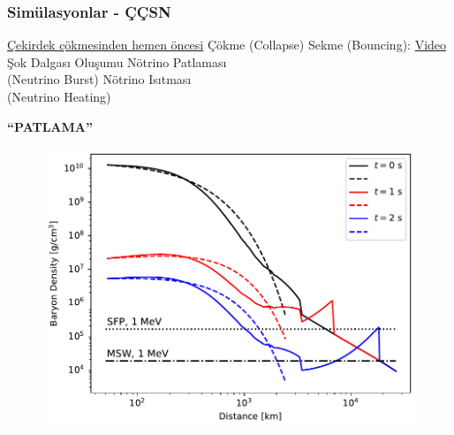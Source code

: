 \documentclass[10pt]{beamer}
\begin{document}
\begin{frame}
    \frametitle{Simülasyonlar - ÇÇSN}
    \begin{minipage}{0.5\textwidth}
        \footnotesize
        \begin{outline}
            \1[\textbullet] \href{https://irfu.cea.fr/dap/Phocea/Vie_des_labos/Ast/ast_sstechnique.php?id_ast=4058}{\color{blue}Çekirdek çökmesinden hemen öncesi}
            \1[\textbullet] Çökme (Collapse)
            \1[\textbullet] Sekme (Bouncing): \href{https://www.youtube.com/clip/Ugkx3nDxd0FXSw_dHn3UGCC0UW8JQ9UhjZn3}{\color{blue}Video}
            \1[\textbullet] Şok Dalgası Oluşumu
            \1[\textbullet] Nötrino Patlaması \\(Neutrino Burst)
            \1[\textbullet] Nötrino Isıtması  \\(Neutrino Heating)
        \end{outline}
        \begin{center}
            \textbf{“PATLAMA”}
        \end{center}
        \begin{outline}
        \end{outline}
        \normalsize
    \end{minipage}
    \hfill
    \begin{minipage}{0.45\textwidth}
        \begin{figure}[hbt!]
            \centering
            \includegraphics[width=1.1\textwidth]{fig/baryonDensity.pdf}
        \end{figure}
    \end{minipage}
\end{frame}
\end{document}
